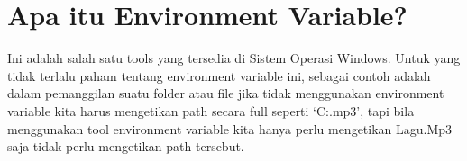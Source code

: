
\section {Apa itu Environment Variable?}
Ini adalah salah satu tools yang tersedia di Sistem Operasi Windows. Untuk yang tidak terlalu paham tentang environment variable ini, sebagai contoh adalah dalam pemanggilan suatu folder atau file jika tidak menggunakan environment variable kita harus mengetikan path secara full seperti `C:\Music\Lagu.mp3', tapi bila menggunakan tool environment variable kita hanya perlu mengetikan Lagu.Mp3 saja tidak perlu mengetikan path tersebut.



